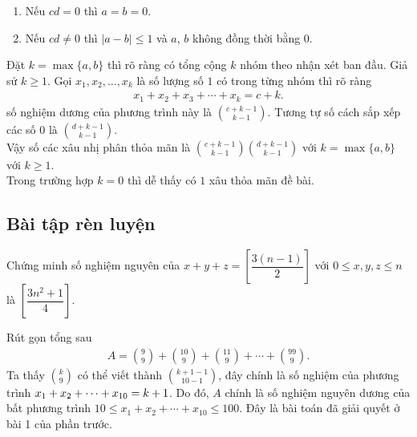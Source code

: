 \begin{bt}[AIME, 1986]
{\begin{nx}
	 \begin{enumerate}[(1)]
	 	\item Nếu $cd = 0$ thì $a = b = 0$.
	 	\item Nếu $cd \neq 0$ thì $|a - b| \leq 1$ và $a$, $b$ không đồng thời bằng $0$.
	 \end{enumerate}
	 Đặt $k = \max\{a,b\}$ thì rõ ràng có tổng cộng $k$ nhóm theo nhận xét ban đầu. Giả sử $k \geq 1$. Gọi $x_1,x_2,\ldots,x_k$ là số lượng số $1$ có trong từng nhóm thì rõ ràng
	 \begin{align*}
	 x_1 + x_2 + x_3 + \cdots + x_k = c + k.
	 \end{align*}
	 số nghiệm dương của phương trình này là $\displaystyle {c+k-1 \choose k-1}$. Tương tự số cách sắp xếp các số $0$ là $\displaystyle {d+k-1 \choose k-1}$.\\
	 Vậy số các xâu nhị phân thỏa mãn là $\displaystyle {c+k-1 \choose k-1} {d+k-1 \choose k-1}$ với $k = \max \{a,b\}$ với $k \geq 1$.\\
	 Trong trường hợp $k = 0$ thì dễ thấy có $1$ xâu thỏa mãn đề bài.
	\end{nx}
	}
\end{bt}


\subsection{Bài tập rèn luyện}

\begin{bt}%
 Chứng minh số nghiệm nguyên của $x + y + z = \left[\dfrac{3(n - 1)}{2} \right] $ với $0 \leq x,y,z \leq n$ là $\left[\dfrac{3n^2 + 1}{4} \right] $.
\end{bt}

\begin{bt}%
 Rút gọn tổng sau
 \begin{align*}
  A = {9 \choose 9} + {10 \choose 9} + {11 \choose 9} + \cdots + {99 \choose 9}.
 \end{align*}
 \loigiai
 {
 Ta thấy $\displaystyle {k \choose 9}$ có thể viết thành $\displaystyle {k+1-1 \choose 10-1}$, đây chính là số nghiệm của phương trình $\break x_1 + x_2 + \cdots + x_{10} = k + 1$. Do đó, $A$ chính là số nghiệm nguyên dương của bất phương trình $10 \leq x_1 + x_2 + \cdots + x_{10} \leq 100$. Đây là bài toán đã giải quyết ở bài 1 của phần trước.
 }
\end{bt}

